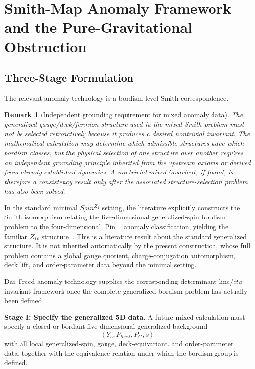 \documentclass[11pt]{article}
\theoremstyle{canonmath}
\newtheorem{remark}[theorem]{Remark}
\theoremstyle{canonpostulate}
\theoremstyle{canonclaim}
\providecommand{\Pin}{\operatorname{Pin}}
\def\mathrm#1{#1}%
\def\mathbb#1{#1}%
\def\eta{eta}%
\begin{document}
\section{Smith-Map Anomaly Framework and the Pure-Gravitational Obstruction}
\label{sec:anomaly}

\subsection{Three-Stage Formulation}

The relevant anomaly technology is a bordism-level Smith correspondence.

\begin{remark}[Independent grounding requirement for mixed anomaly data]
The generalized gauge/deck/fermion structure used in the mixed Smith problem must not be selected retroactively because it produces a desired nontrivial invariant. The mathematical calculation may determine which admissible structures have which bordism classes, but the physical selection of one structure over another requires an independent grounding principle inherited from the upstream axioms or derived from already-established dynamics. A nontrivial mixed invariant, if found, is therefore a consistency result only after the associated structure-selection problem has also been solved.
\end{remark}

In the standard minimal $\mathrm{Spin}^{\mathbb Z_4}$ setting, the literature explicitly constructs the Smith isomorphism relating the five-dimensional generalized-spin bordism problem to the four-dimensional $\Pin^+$ anomaly classification, yielding the familiar $\mathbb Z_{16}$ structure~\cite{HasonKomargodskiThorngren,GarciaEtxebarria}. This is a literature result about the standard generalized structure. It is not inherited automatically by the present construction, whose full problem contains a global gauge quotient, charge-conjugation automorphism, deck lift, and order-parameter data beyond the minimal setting.

Dai--Freed anomaly technology supplies the corresponding determinant-line/$\eta$-invariant framework once the complete generalized bordism problem has actually been defined~\cite{DaiFreed,GarciaEtxebarria}.

\textbf{Stage I: Specify the generalized 5D data.} A future mixed calculation must specify a closed or bordant five-dimensional generalized background
\begin{equation}
(Y_5,P_{\mathrm{local}},P_G,s)
\end{equation}
with all local generalized-spin, gauge, deck-equivariant, and order-parameter data, together with the equivalence relation under which the bordism group is defined.
\end{document}
